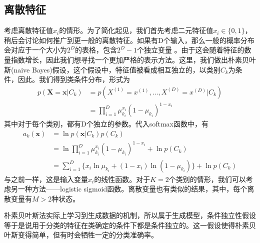 \subsection*{离散特征}
考虑离散特征值$x_i$的情形。为了简化起见，我们首先考虑二元特征值$x_i\in \{0,1\}$，稍后会讨论如何推广到更一般的离散特征。如果有D个输入，那么一般的概率分布会对应于一个大小为$2^D$的表格，包含$2^D-1$个独立变量 。由于这会随着特征的数量指数增长，因此我们想寻找一个更加严格的表示方法。这里，我们做出朴素贝叶斯(naive Bayes)假设，这个假设中，特征值被看成相互独立的，以类别$C_k$为条件，因此。我们得到类条件分布，形式为
\begin{equation}
\begin{aligned}
	p(\boldsymbol{X}=\boldsymbol{x}|C_k)&=p(X^{(1)}=x^{(1)},\dots,X^{(D)}=x^{(D)}|C_k)\\
	&=\prod_{i=1}^{D}\mu_{k_i}^{x_i}(1-\mu_{k_i})^{1-x_i}
\end{aligned}
\end{equation}
其中对于每个类别，都有D个独立的参数。代入softmax函数中，有
\begin{equation}
	\begin{aligned}
	a_k(\boldsymbol{x})&=\ln p(\boldsymbol{x}|C_k)p(C_k)\\
	&=\ln \prod_{i=1}^{D}\mu_{k_i}^{x_i}(1-\mu_{k_i})^{1-x_i} + \ln p(C_k)\\
	&=\sum_{i=1}^{D}\{x_i\ln \mu_{k_i}+(1-x_i)\ln (1-\mu_{k_i}) \}+\ln p(C_k)
	\end{aligned}
\end{equation}
与之前一样，这是输入变量$x_i$的线性函数。对于$K=2$个类别的情形，我们可以考虑另一种方法——logistic sigmoid函数。离散变量也有类似的结果，其中，每个离散变量有$M>2$种状态。

朴素贝叶斯法实际上学习到生成数据的机制，所以属于生成模型，条件独立性假设等于是说用于分类的特征在类确定的条件下都是条件独立的。这一假设使得朴素贝叶斯变得简单，但有时会牺牲一定的分类准确率。

